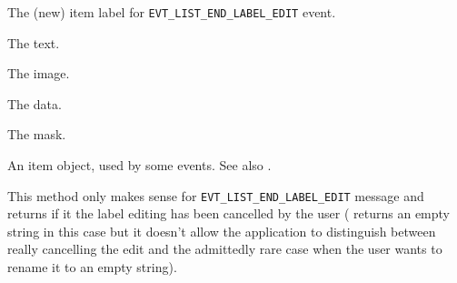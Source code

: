 
The (new) item label for \texttt{EVT\_LIST\_END\_LABEL\_EDIT} event.


\label{wxlisteventgettext}


The text.


\label{wxlisteventgetimage}


The image.


\label{wxlisteventgetdata}


The data.


\label{wxlisteventgetmask}


The mask.


\label{wxlisteventgetitem}


An item object, used by some events. See also .


\label{wxlisteventiseditcancelled}


This method only makes sense for \texttt{EVT\_LIST\_END\_LABEL\_EDIT} message
and returns \true if it the label editing has been cancelled by the user
( returns an empty string in this case
but it doesn't allow the application to distinguish between really cancelling the edit and
the admittedly rare case when the user wants to rename it to an empty string).


